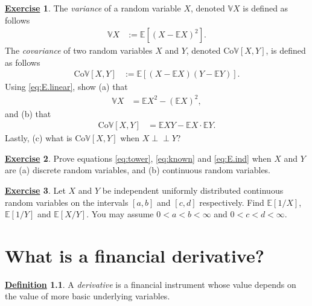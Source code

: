 \documentclass[12pt]{book}
\numberwithin{equation}{chapter}
\theoremstyle{plain}
\numberwithin{theorem}{section}
\theoremstyle{definition}
\newtheorem{definition}[theorem]{\underline{Definition}}
\newtheorem{exercise}{\underline{Exercise}}
\numberwithin{exercise}{chapter}
\newcommand{\<}{\langle}
\renewcommand{\>}{\rangle}
\renewcommand{\(}{\left(}
\renewcommand{\)}{\right)}
\renewcommand{\[}{\left[}
\renewcommand{\]}{\right]}
\newcommand\Eb{\mathds{E}}
\newcommand\Vb{\mathds{V}}
\newcommand{\ind}{\perp \! \! \! \perp}
\theoremstyle{definition}
\numberwithin{question}{section}
\begin{document}
\begin{exercise}
\label{exer:A-4}
The \textit{variance} of a random variable $X$, denoted $\Vb X$ is defined as follows
\begin{align}
\Vb X
	&:=	\Eb[ (X - \Eb X)^2 ] .	\label{eq:variance}
\end{align}
The \textit{covariance} of two random variables $X$ and $Y$, denoted $\text{Co}\Vb[X,Y]$, is defined as follows
\begin{align}
\text{Co}\Vb[X,Y]
	&:=	\Eb[ (X - \Eb X)(Y - \Eb Y) ] .	\label{eq:covariance}
\end{align}
Using \eqref{eq:E.linear}, show (a) that
\begin{align}
\Vb X
	&=	\Eb X^2 - ( \Eb X )^2 ,
\end{align}
and (b) that
\begin{align}
\text{Co}\Vb[X,Y]
	&=	\Eb XY - \Eb X \cdot \Eb Y .
\end{align}
Lastly, (c) what is $\text{Co}\Vb[X,Y]$ when $X \ind Y$?
\end{exercise}

\begin{exercise}
\label{exer:A-5}
Prove equations \eqref{eq:tower}, \eqref{eq:known} and \eqref{eq:E.ind} when $X$ and $Y$ are (a) discrete random variables, and (b) continuous random variables.
\end{exercise}

\begin{exercise}
\label{exer:A-6}
Let $X$ and $Y$ be independent uniformly distributed continuous random variables on the intervals $[a,b]$ and $[c,d]$ respectively. Find $\Eb[1/X]$, $\Eb[1/Y]$ and $\Eb[X/Y]$.  You may assume $0 < a < b < \infty$ and $0 < c < d < \infty$.

\end{exercise}




\chapter{What is a financial derivative?}
\begin{definition}
A \textit{derivative} is a financial instrument whose value depends on the value of more basic underlying variables.
\end{definition}
\end{document}
